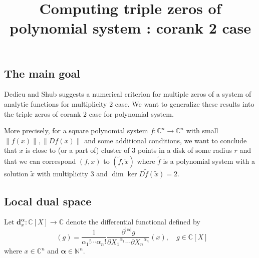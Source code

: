 \documentclass[12pt,oneside,reqno]{amsart}
\title{Computing triple zeros of polynomial system : corank 2 case}
\theoremstyle{definition}
\DeclareMathOperator{\diffop}{\mathbf{d}^\mathbf{\alpha}_x}
\begin{document}
\maketitle
\subsection{The main goal}
Dedieu and Shub \cite{dedieu2001simple} suggests a numerical criterion for multiple zeros of a system of analytic functions for multiplicity $2$ case. We want to generalize these results into the triple zeros of corank $2$ case for polynomial system.

More precisely, for a square polynomial system $f:\mathbb{C}^n\rightarrow \mathbb{C}^n$ with small $\|f(x)\|,\|Df(x)\|$ and some additional conditions, we want to conclude that $x$ is close to (or a part of) cluster of $3$ points in a disk of some radius $r$ and that we can correspond $(f,x)$ to $(\tilde{f},\tilde{x})$ where $\tilde{f}$ is a polynomial system with a solution $\tilde{x}$ with multiplicity $3$ and $\dim\ker D\tilde{f}(\tilde{x})=2$.

\subsection{Local dual space}
Let $\mathbf{d}^\mathbf{\alpha}_x :\mathbb{C}[X]\rightarrow \mathbb{C}$ denote the differential functional defined by
\[\diffop(g)=\frac{1}{\alpha_1!\cdots \alpha_n!}\frac{\partial^{|\mathbf{\alpha}|}g}{\partial {X_1}^{\alpha_1}\cdots \partial{X_n}^{\alpha_n}}(x), \quad g\in \mathbb{C}[X]\]
where $x\in \mathbb{C}^n$ and $\mathbf{\alpha}\in \mathbb{N}^n$.
\end{document}
